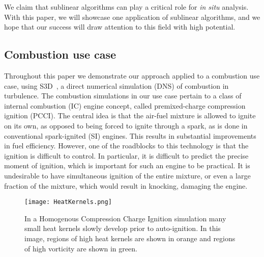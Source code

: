 \documentclass[final]{siamltex}
\begin{document}
We claim that  sublinear algorithms can play a critical role  for \emph{in
situ} analysis. With this 
paper, we  will showcase one application of sublinear algorithms, and we hope that   our 
success will draw attention to this field with high potential. 

\subsection{Combustion use case}
Throughout this paper we demonstrate our approach applied to a combustion
use case, using S3D~\cite{chen09}, a direct numerical simulation (DNS) of 
combustion in turbulence.  
The combustion simulations in our use case pertain to a class of internal combustion
(IC) engine concept, called premixed-charge compression ignition (PCCI). The
central idea is that the air-fuel mixture is allowed to ignite on its own, as opposed to being forced to ignite through a spark, as
is done in conventional spark-ignited (SI) engines. This results in
substantial improvements in fuel efficiency. However, one of the roadblocks to
this technology is that the ignition is difficult to control. In
particular, it is difficult to predict the precise moment of ignition,
which is important for such an engine to be practical. It is undesirable to
have simultaneous ignition of the entire mixture, or even a large fraction
of the mixture, which would result in knocking, damaging the engine. \\ 

\begin{figure}[th]
\centering
\texttt{[image: HeatKernels.png]}
\caption{\label{fig:kernels} In a Homogenous Compression Charge Ignition
simulation many small heat kernels slowly develop prior to auto-ignition.
In this image, regions of high heat kernels are shown in orange and regions
of high vorticity are shown in green.}
\end{figure}
\end{document}
